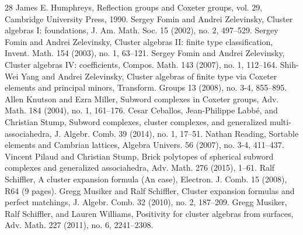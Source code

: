 \documentclass[10pt]{amsart}
\theoremstyle{definition}\newtheorem{rema}[theo]{Remark}\newtheorem{exem}[theo]{Example}
\begin{document}
\begin{thebibliography}{28}
 James E. Humphreys, Reflection groups and Coxeter groups, vol. 29, Cambridge University Press, 1990.
 Sergey Fomin and Andrei Zelevinsky, Cluster algebras I: foundations, J. Am. Math. Soc. 15 (2002), no. 2, 497–529.
 Sergey Fomin and Andrei Zelevinsky, Cluster algebras II: finite type classification, Invent. Math. 154 (2003), no. 1, 63–121.
 Sergey Fomin and Andrei Zelevinsky, Cluster algebras IV: coefficients, Compos. Math. 143 (2007), no. 1, 112–164.
 Shih-Wei Yang and Andrei Zelevinsky, Cluster algebras of finite type via Coxeter elements and principal minors, Transform. Groups 13 (2008), no. 3-4, 855–895.
 Allen Knutson and Ezra Miller, Subword complexes in Coxeter groups, Adv. Math. 184 (2004), no. 1, 161–176.
 Cesar Ceballos, Jean-Philippe Labbé, and Christian Stump, Subword complexes, cluster complexes, and generalized multi-associahedra, J. Algebr. Comb. 39 (2014), no. 1, 17–51.
 Nathan Reading, Sortable elements and Cambrian lattices, Algebra Univers. 56 (2007), no. 3-4, 411–437.
 Vincent Pilaud and Christian Stump, Brick polytopes of spherical subword complexes and generalized associahedra, Adv. Math. 276 (2015), 1–61.
 Ralf Schiffler, A cluster expansion formula (An case), Electron. J. Comb. 15 (2008), R64 (9 pages).
 Gregg Musiker and Ralf Schiffler, Cluster expansion formulas and perfect matchings, J. Algebr. Comb. 32 (2010), no. 2, 187–209.
 Gregg Musiker, Ralf Schiffler, and Lauren Williams, Positivity for cluster algebras from surfaces, Adv. Math. 227 (2011), no. 6, 2241–2308.
\end{thebibliography}
\end{document}
